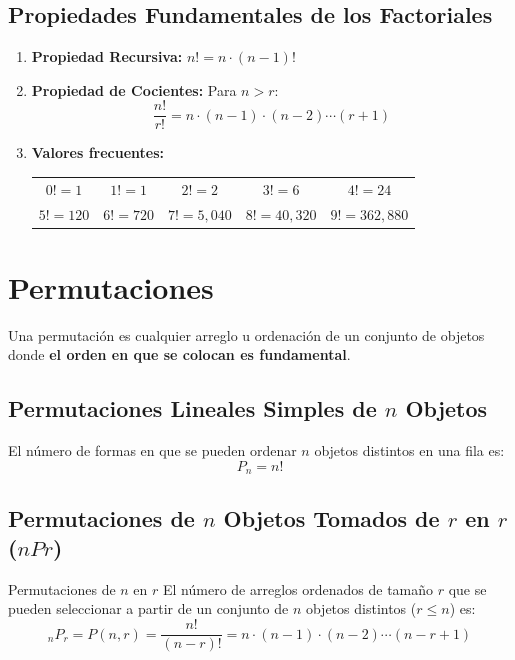 \subsection{Propiedades Fundamentales de los Factoriales}
\begin{enumerate}
    \item \textbf{Propiedad Recursiva:} $n! = n \cdot (n-1)!$
    \item \textbf{Propiedad de Cocientes:} Para $n > r$:
    \[
    \frac{n!}{r!} = n \cdot (n-1) \cdot (n-2) \dotsm (r+1)
    \]
    \item \textbf{Valores frecuentes:}
    \begin{center}
    \begin{tabular}{ccccc}
    \toprule
    $0! = 1$ & $1! = 1$ & $2! = 2$ & $3! = 6$ & $4! = 24$ \\
    $5! = 120$ & $6! = 720$ & $7! = 5{,}040$ & $8! = 40{,}320$ & $9! = 362{,}880$ \\
    \bottomrule
    \end{tabular}
    \end{center}
\end{enumerate}

\section{Permutaciones}
Una permutación es cualquier arreglo u ordenación de un conjunto de objetos donde \textbf{el orden en que se colocan es fundamental}.

\subsection{Permutaciones Lineales Simples de $n$ Objetos}
El número de formas en que se pueden ordenar $n$ objetos distintos en una fila es:
\begin{equation}
    P_n = n!
\end{equation}

\subsection{Permutaciones de $n$ Objetos Tomados de $r$ en $r$ ($nPr$)}
\begin{definicion}{Permutaciones de $n$ en $r$}
El número de arreglos ordenados de tamaño $r$ que se pueden seleccionar a partir de un conjunto de $n$ objetos distintos ($r \le n$) es:
\begin{equation}
    {}_n P_r = P(n, r) = \frac{n!}{(n-r)!} = n \cdot (n-1) \cdot (n-2) \dotsm (n-r+1)
\end{equation}
\end{definicion}

